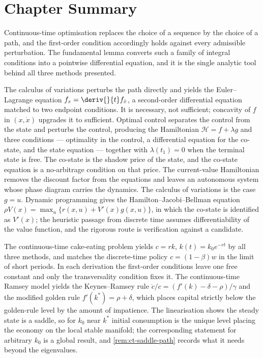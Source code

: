 \section{Chapter Summary}\label{sec:ct-summary}

Continuous-time optimisation replaces the choice of a sequence by the choice of a
path, and the first-order condition accordingly holds against every admissible
perturbation. The fundamental lemma converts such a family of integral conditions
into a pointwise differential equation, and it is the single analytic tool behind
all three methods presented.

The calculus of variations perturbs the path directly and yields the
Euler--Lagrange equation $f_x=\deriv{}{t}f_{\dot x}$, a second-order differential
equation matched to two endpoint conditions. It is necessary, not sufficient;
concavity of $f$ in $(x,\dot x)$ upgrades it to sufficient. Optimal control
separates the control from the state and perturbs the control, producing the
Hamiltonian $\mathcal{H}=f+\lambda g$ and three conditions --- optimality in the
control, a differential equation for the co-state, and the state equation ---
together with $\lambda(t_1)=0$ when the terminal state is free. The co-state is
the shadow price of the state, and the co-state equation is a no-arbitrage
condition on that price. The current-value Hamiltonian removes the discount factor
from the equations and leaves an autonomous system whose phase diagram carries
the dynamics. The calculus of variations is the case $g=u$. Dynamic programming
gives the Hamilton--Jacobi--Bellman equation
$\rho V(x)=\max_u\{r(x,u)+V'(x)g(x,u)\}$, in which the co-state is identified as
$V'(x)$; the heuristic passage from discrete time assumes differentiability of
the value function, and the rigorous route is verification against a candidate.

The continuous-time cake-eating problem yields $c=rk$, $k(t)=k_0e^{-rt}$ by all
three methods, and matches the discrete-time policy $c=(1-\beta)w$ in the limit
of short periods. In each derivation the first-order conditions leave one free
constant and only the transversality condition fixes it. The continuous-time
Ramsey model yields the Keynes--Ramsey rule
$\dot c/c=(f'(k)-\delta-\rho)/\gamma$ and the modified golden rule
$f'(k^{\ast})=\rho+\delta$, which places capital strictly below the golden-rule
level by the amount of impatience. The linearisation shows the steady state is a
saddle, so for $k_0$ near $k^{\ast}$ initial consumption is the unique level
placing the economy on the local stable manifold; the corresponding statement
for arbitrary $k_0$ is a global result, and \autoref{rem:ct-saddle-path} records
what it needs beyond the eigenvalues.

